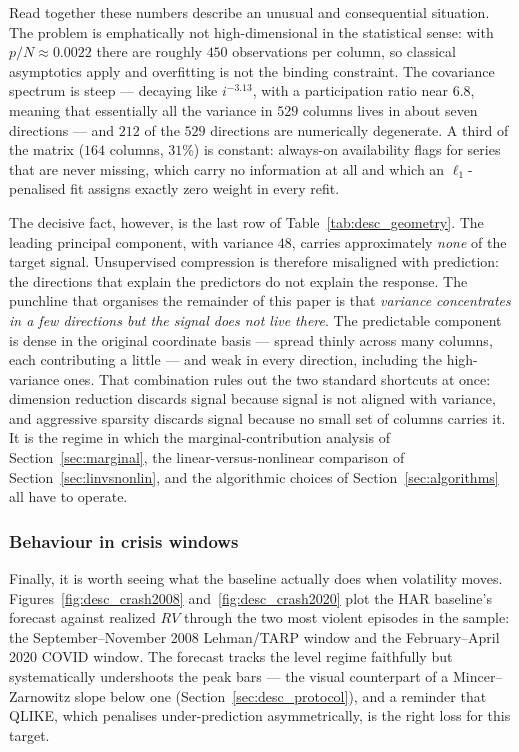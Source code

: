 Read together these numbers describe an unusual and consequential situation.
The problem is emphatically not high-dimensional in the statistical sense: with
$p/N \approx 0.0022$ there are roughly $450$ observations per column, so
classical asymptotics apply and overfitting is not the binding constraint. The
covariance spectrum is steep --- decaying like $i^{-3.13}$, with a participation
ratio near $6.8$, meaning that essentially all the variance in $529$ columns
lives in about seven directions --- and $212$ of the $529$ directions are
numerically degenerate. A third of the matrix ($164$ columns, $31\%$) is
constant: always-on availability flags for series that are never missing, which
carry no information at all and which an $\ell_1$-penalised fit assigns exactly
zero weight in every refit.

The decisive fact, however, is the last row of
Table~\ref{tab:desc_geometry}. The leading principal component, with variance
$48$, carries approximately \emph{none} of the target signal. Unsupervised
compression is therefore misaligned with prediction: the directions that explain
the predictors do not explain the response. The punchline that organises the
remainder of this paper is that \emph{variance concentrates in a few directions
but the signal does not live there}. The predictable component is dense in the
original coordinate basis --- spread thinly across many columns, each
contributing a little --- and weak in every direction, including the
high-variance ones. That combination rules out the two standard shortcuts at
once: dimension reduction discards signal because signal is not aligned with
variance, and aggressive sparsity discards signal because no small set of
columns carries it. It is the regime in which the marginal-contribution analysis
of Section~\ref{sec:marginal}, the linear-versus-nonlinear comparison of
Section~\ref{sec:linvsnonlin}, and the algorithmic choices of
Section~\ref{sec:algorithms} all have to operate.

\subsubsection{Behaviour in crisis windows}

Finally, it is worth seeing what the baseline actually does when volatility
moves. Figures~\ref{fig:desc_crash2008} and~\ref{fig:desc_crash2020} plot the
HAR baseline's forecast against realized $RV$ through the two most violent
episodes in the sample: the September--November 2008 Lehman/TARP window and the
February--April 2020 COVID window. The forecast tracks the level regime
faithfully but systematically undershoots the peak bars --- the visual
counterpart of a Mincer--Zarnowitz slope below one
(Section~\ref{sec:desc_protocol}), and a reminder that QLIKE, which penalises
under-prediction asymmetrically, is the right loss for this target.

